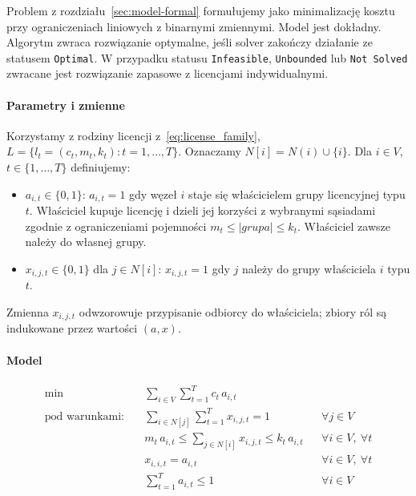 Problem z rozdziału~\ref{sec:model-formal} formułujemy jako minimalizację kosztu przy ograniczeniach liniowych z binarnymi zmiennymi. Model jest dokładny. Algorytm zwraca rozwiązanie optymalne, jeśli solver zakończy działanie ze statusem \texttt{Optimal}. W przypadku statusu \texttt{Infeasible}, \texttt{Unbounded} lub \texttt{Not Solved} zwracane jest rozwiązanie zapasowe z licencjami indywidualnymi.

\paragraph{Parametry i zmienne}
Korzystamy z rodziny licencji z~\eqref{eq:license_family},
\(L=\{l_t=(c_t,m_t,k_t):t=1,\dots,T\}\).
Oznaczamy \(N[i]=N(i)\cup\{i\}\). Dla \(i\in V\), \(t\in\{1,\dots,T\}\) definiujemy:
\begin{itemize}
  \item \(a_{i,t}\in\{0,1\}\): \(a_{i,t}=1\) gdy węzeł \(i\) staje się właścicielem grupy licencyjnej typu \(t\). Właściciel kupuje licencję i dzieli jej korzyści z wybranymi sąsiadami zgodnie z ograniczeniami pojemności \(m_t \leq |grupa| \leq k_t\). Właściciel zawsze należy do własnej grupy.
  \item \(x_{i,j,t}\in\{0,1\}\) dla \(j\in N[i]\): \(x_{i,j,t}=1\) gdy \(j\) należy do grupy właściciela \(i\) typu \(t\).
\end{itemize}
Zmienna \(x_{i,j,t}\) odwzorowuje przypisanie odbiorcy do właściciela; zbiory ról są indukowane przez wartości \((a,x)\).

\paragraph{Model}
\begin{align}
  \min\quad & \sum_{i\in V}\sum_{t=1}^{T} c_t\, a_{i,t}                                                                        \\
  \text{pod warunkami:}\quad
            & \sum_{i\in N[j]}\sum_{t=1}^{T} x_{i,j,t} = 1
            &                                                                & \forall j\in V \label{con:cover}                \\
            & m_t\, a_{i,t} \le \sum_{j\in N[i]} x_{i,j,t} \le k_t\, a_{i,t}
            &                                                                & \forall i\in V,\ \forall t \label{con:capacity} \\
            & x_{i,i,t} = a_{i,t}
            &                                                                & \forall i\in V,\ \forall t \label{con:owner}    \\
            & \sum_{t=1}^{T} a_{i,t} \le 1
            &                                                                & \forall i\in V \label{con:one}
\end{align}

